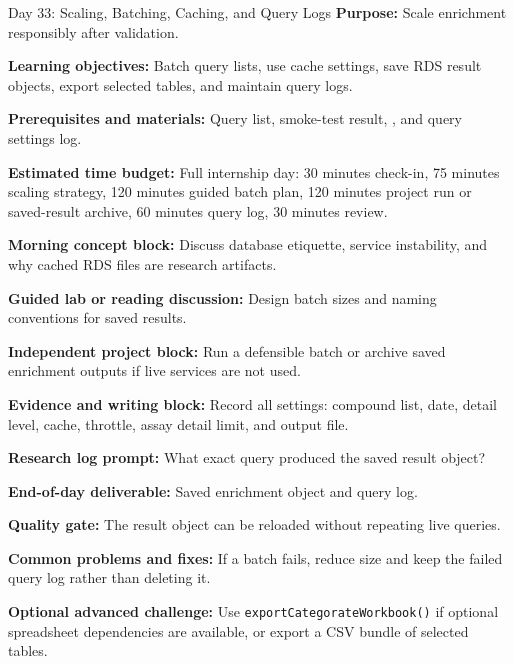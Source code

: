 \begin{dailybox}{Day 33: Scaling, Batching, Caching, and Query Logs}
\textbf{Purpose:} Scale enrichment responsibly after validation.

\textbf{Learning objectives:} Batch query lists, use cache settings, save RDS result objects, export selected tables, and maintain query logs.

\textbf{Prerequisites and materials:} Query list, smoke-test result, , and query settings log.

\textbf{Estimated time budget:} Full internship day: 30 minutes check-in, 75 minutes scaling strategy, 120 minutes guided batch plan, 120 minutes project run or saved-result archive, 60 minutes query log, 30 minutes review.

\textbf{Morning concept block:} Discuss database etiquette, service instability, and why cached RDS files are research artifacts.

\textbf{Guided lab or reading discussion:} Design batch sizes and naming conventions for saved results.

\textbf{Independent project block:} Run a defensible batch or archive saved enrichment outputs if live services are not used.

\textbf{Evidence and writing block:} Record all settings: compound list, date, detail level, cache, throttle, assay detail limit, and output file.

\textbf{Research log prompt:} What exact query produced the saved result object?

\textbf{End-of-day deliverable:} Saved enrichment object and query log.

\textbf{Quality gate:} The result object can be reloaded without repeating live queries.

\textbf{Common problems and fixes:} If a batch fails, reduce size and keep the failed query log rather than deleting it.

\textbf{Optional advanced challenge:} Use \texttt{exportCategorateWorkbook()} if optional spreadsheet dependencies are available, or export a CSV bundle of selected tables.
\end{dailybox}

